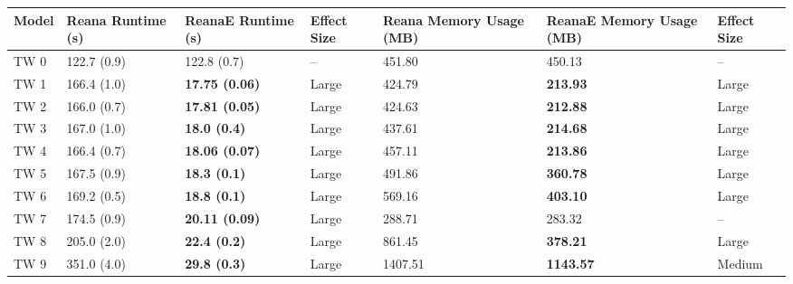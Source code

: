 \begin{tabular}{lllllll}
\toprule
Model & Reana Runtime (s) &     ReanaE Runtime (s) & Effect Size & Reana Memory Usage (MB) & ReanaE Memory Usage (MB) & Effect Size \\
\midrule
 TW 0 &       122.7 (0.9) &            122.8 (0.7) &          -- &                  451.80 &                   450.13 &          -- \\
 TW 1 &       166.4 (1.0) &  \textbf{17.75 (0.06)} &       Large &                  424.79 &          \textbf{213.93} &       Large \\
 TW 2 &       166.0 (0.7) &  \textbf{17.81 (0.05)} &       Large &                  424.63 &          \textbf{212.88} &       Large \\
 TW 3 &       167.0 (1.0) &    \textbf{18.0 (0.4)} &       Large &                  437.61 &          \textbf{214.68} &       Large \\
 TW 4 &       166.4 (0.7) &  \textbf{18.06 (0.07)} &       Large &                  457.11 &          \textbf{213.86} &       Large \\
 TW 5 &       167.5 (0.9) &    \textbf{18.3 (0.1)} &       Large &                  491.86 &          \textbf{360.78} &       Large \\
 TW 6 &       169.2 (0.5) &    \textbf{18.8 (0.1)} &       Large &                  569.16 &          \textbf{403.10} &       Large \\
 TW 7 &       174.5 (0.9) &  \textbf{20.11 (0.09)} &       Large &                  288.71 &                   283.32 &          -- \\
 TW 8 &       205.0 (2.0) &    \textbf{22.4 (0.2)} &       Large &                  861.45 &          \textbf{378.21} &       Large \\
 TW 9 &       351.0 (4.0) &    \textbf{29.8 (0.3)} &       Large &                 1407.51 &         \textbf{1143.57} &      Medium \\
\bottomrule
\end{tabular}
